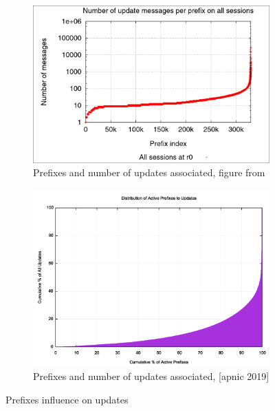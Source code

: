 \begin{figure}[h]
     \centering
     \begin{subfigure}[b]{0.48\textwidth}
         \centering
         \includegraphics[width=\textwidth]{images/RFD/miceVSelephants/prefixVSmessagesRbush.png}
		 \caption{Prefixes and number of updates associated, figure from \cite{pelsser2011route}}
         \label{fig:RBushPrefixes}
     \end{subfigure}
     \hfill
     \begin{subfigure}[b]{0.48\textwidth}
         \centering
         \includegraphics[width=\textwidth]{images/RFD/miceVSelephants/bgp2fig5-pfx-upds-cuml.png}
         \caption{Prefixes and number of updates associated, [apnic 2019]}
         \label{fig:apnicPrefixes}
     \end{subfigure}
        \caption{Prefixes influence on updates}
        \label{fig:prefixVSmessages}
\end{figure}

